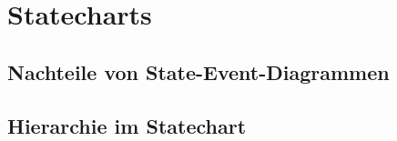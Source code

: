 \section{Statecharts}

\subsection{Nachteile von State-Event-Diagrammen}


\subsection{Hierarchie im Statechart}


